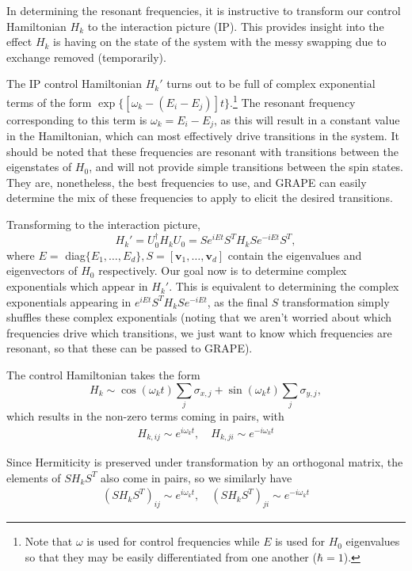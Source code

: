 \documentclass[../Thesis.tex]{subfiles}
\begin{document}
In determining the resonant frequencies, it is instructive to transform our control Hamiltonian $H_k$ to the interaction picture (IP). This provides insight into the effect $H_k$ is having on the state of the system with the messy swapping due to exchange removed (temporarily). 

The IP control Hamiltonian $H_k'$ turns out to be full of complex exponential terms of the form $\exp\{[\omega_k - (E_i-E_j)]t\}$.\footnote{Note that $\omega$ is used for control frequencies while $E$ is used for $H_0$ eigenvalues so that they may be easily differentiated from one another ($\hbar=1$).} The resonant frequency corresponding to this term is $\omega_k=E_i-E_j$, as this will result in a constant value in the Hamiltonian, which can most effectively drive transitions in the system. It should be noted that these frequencies are resonant with transitions between the eigenstates of $H_0$, and will not provide simple transitions between the spin states. They are, nonetheless, the best frequencies to use, and GRAPE can easily determine the mix of these frequencies to apply to elicit the desired transitions.

Transforming to the interaction picture,
\begin{equation}
    H_k' = U_0^\dagger H_k U_0 = Se^{iEt}S^T H_k S e^{-iEt}S^T,
\end{equation}
where $E=$ diag$\{E_1,\dots, E_d\},S=[\bm{v}_1,\dots,\bm{v}_d]$ contain the eigenvalues and eigenvectors of $H_0$ respectively. Our goal now is to determine complex exponentials which appear in $H_k'$. This is equivalent to determining the complex exponentials appearing in $e^{iEt}S^T H_k S e^{-iEt}$, as the final $S$ transformation simply shuffles these complex exponentials (noting that we aren't worried about which frequencies drive which transitions, we just want to know which frequencies are resonant, so that these can be passed to GRAPE).

The control Hamiltonian takes the form 
\begin{equation}
    H_k\sim \cos(\omega_k t)\sum_j \sigma_{x,j} + \sin(\omega_k t)\sum_j \sigma_{y,j},
\end{equation}
which results in the non-zero terms coming in pairs, with 
\begin{align} 
H_{k,ij} \sim e^{i\omega_k t},\quad H_{k,ji} \sim e^{-i\omega_k t}
\end{align}

Since Hermiticity is preserved under transformation by an orthogonal matrix, the elements of $SH_kS^T$ also come in pairs, so we similarly have 
\begin{align} 
(SH_{k}S^T)_{ij}\sim e^{i\omega_k t},\quad (SH_{k}S^T)_{ji} \sim e^{-i\omega_k t}
\end{align}
\end{document}
